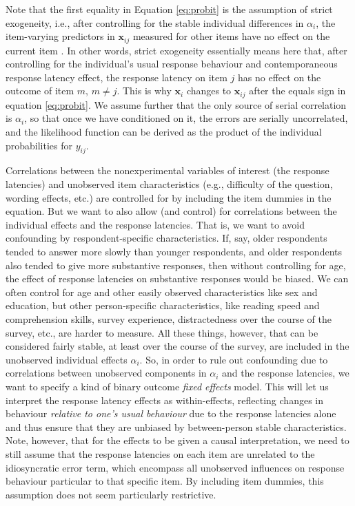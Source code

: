 \documentclass[Royal,times,sageh]{sagej}
\begin{document}
Note that the first equality in Equation \eqref{eq:probit} is the
assumption of strict exogeneity, i.e., after controlling for the stable
individual differences in \(\alpha_{i}\), the item-varying predictors in
\(\bm{x}_{ij}\) measured for other items have no effect on the current
item \citep[p.~483]{Wooldridge2002}. In other words, strict exogeneity
essentially means here that, after controlling for the individual's
usual response behaviour and contemporaneous response latency effect,
the response latency on item \(j\) has no effect on the outcome of item
\(m\), \(m \ne j\). This is why \(\bm{x}_{i}\) changes to
\(\bm{x}_{ij}\) after the equals sign in equation \eqref{eq:probit}. We
assume further that the only source of serial correlation is
\(\alpha_{i}\), so that once we have conditioned on it, the errors are
serially uncorrelated, and the likelihood function can be derived as the
product of the individual probabilities for \(y_{ij}\).

Correlations between the nonexperimental variables of interest (the
response latencies) and unobserved item characteristics (e.g.,
difficulty of the question, wording effects, etc.) are controlled for by
including the item dummies in the equation. But we want to also allow
(and control) for correlations between the individual effects and the
response latencies. That is, we want to avoid confounding by
respondent-specific characteristics. If, say, older respondents tended
to answer more slowly than younger respondents, and older respondents
also tended to give more substantive responses, then without controlling
for age, the effect of response latencies on substantive responses would
be biased. We can often control for age and other easily observed
characteristics like sex and education, but other person-specific
characteristics, like reading speed and comprehension skills, survey
experience, distractedness over the course of the survey, etc., are
harder to measure. All these things, however, that can be considered
fairly stable, at least over the course of the survey, are included in
the unobserved individual effects \(\alpha_{i}\). So, in order to rule
out confounding due to correlations between unobserved components in
\(\alpha_{i}\) and the response latencies, we want to specify a kind of
binary outcome \textit{fixed effects} model. This will let us interpret
the response latency effects as within-effects, reflecting changes in
behaviour \emph{relative to one's usual behaviour} due to the response
latencies alone and thus ensure that they are unbiased by between-person
stable characteristics. Note, however, that for the effects to be given
a causal interpretation, we need to still assume that the response
latencies on each item are unrelated to the idiosyncratic error term,
which encompass all unobserved influences on response behaviour
particular to that specific item. By including item dummies, this
assumption does not seem particularly restrictive.
\end{document}
